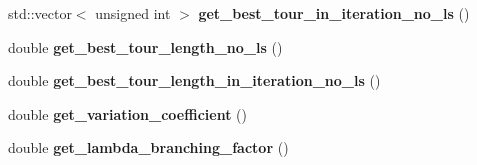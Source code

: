 \begin{CompactItemize}
\item 
\hypertarget{classAntColony_ca741db15566fb6cb9b9f565c9a772f8}{
std::vector$<$ unsigned int $>$ \textbf{get\_\-best\_\-tour\_\-in\_\-iteration\_\-no\_\-ls} ()}
\label{classAntColony_ca741db15566fb6cb9b9f565c9a772f8}

\item 
\hypertarget{classAntColony_c47e768d53f1454d4bfb471527b04f24}{
double \textbf{get\_\-best\_\-tour\_\-length\_\-no\_\-ls} ()}
\label{classAntColony_c47e768d53f1454d4bfb471527b04f24}

\item 
\hypertarget{classAntColony_ac831365482977d9ed7ca081a1186721}{
double \textbf{get\_\-best\_\-tour\_\-length\_\-in\_\-iteration\_\-no\_\-ls} ()}
\label{classAntColony_ac831365482977d9ed7ca081a1186721}

\item 
\hypertarget{classAntColony_4a0be6c6648a4cea87527ea6300cba3f}{
double \textbf{get\_\-variation\_\-coefficient} ()}
\label{classAntColony_4a0be6c6648a4cea87527ea6300cba3f}

\item 
\hypertarget{classAntColony_ec6fb957b6b4f5bcad9cf656c653c7ae}{
double \textbf{get\_\-lambda\_\-branching\_\-factor} ()}
\label{classAntColony_ec6fb957b6b4f5bcad9cf656c653c7ae}

\end{CompactItemize}
